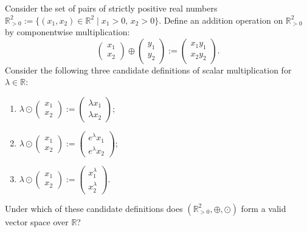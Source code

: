 \begin{exercise}
\label{exc:positive_reals_vector_space_mc}
Consider the set of pairs of strictly positive real numbers $\mathbb{R}_{>0}^2 := \{(x_1, x_2) \in \mathbb{R}^2 \mid x_1 > 0, \, x_2 > 0\}$. Define an addition operation on $\mathbb{R}_{>0}^2$ by componentwise multiplication:
\[
\begin{pmatrix} x_1 \\ x_2 \end{pmatrix} \oplus \begin{pmatrix} y_1 \\ y_2 \end{pmatrix} := \begin{pmatrix} x_1 y_1 \\ x_2 y_2 \end{pmatrix}.
\]
Consider the following three candidate definitions of scalar multiplication for $\lambda \in \mathbb{R}$:
\begin{enumerate}[label=\textbf{(\arabic*)}]
    \item $\lambda \odot \left(\begin{smallmatrix} x_1 \\ x_2 \end{smallmatrix}\right) := \left(\begin{smallmatrix} \lambda x_1 \\ \lambda x_2 \end{smallmatrix}\right)$;
    \item $\lambda \odot \left(\begin{smallmatrix} x_1 \\ x_2 \end{smallmatrix}\right) := \left(\begin{smallmatrix} e^{\lambda} x_1 \\ e^{\lambda} x_2 \end{smallmatrix}\right)$;
    \item $\lambda \odot \left(\begin{smallmatrix} x_1 \\ x_2 \end{smallmatrix}\right) := \left(\begin{smallmatrix} x_1^{\lambda} \\ x_2^{\lambda} \end{smallmatrix}\right)$.
\end{enumerate}
Under which of these candidate definitions does $(\mathbb{R}_{>0}^2, \oplus, \odot)$ form a valid vector space over $\mathbb{R}$?
\end{exercise}

